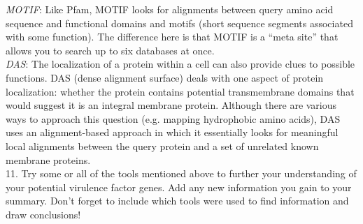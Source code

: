 \emph{MOTIF}: Like Pfam, MOTIF looks for alignments between query amino acid sequence and functional domains and motifs (short sequence segments associated with some function).  The difference here is that MOTIF is a “meta site” that allows you to search up to six databases at once. \\

\emph{DAS}: The localization of a protein within a cell can also provide clues to possible functions.  DAS (dense alignment surface) deals with one aspect of protein localization: whether the protein contains potential transmembrane domains that would suggest it is an integral membrane protein.  Although there are various ways to approach this question (e.g. mapping hydrophobic amino acids), DAS uses an alignment-based approach in which it essentially looks for meaningful local alignments between the query protein and a set of unrelated known membrane proteins. \\

11.  Try some or all of the tools mentioned above to further your understanding of your potential virulence factor genes.  Add any new information you gain to your summary.  Don't forget to include which tools were used to find information and draw conclusions!

